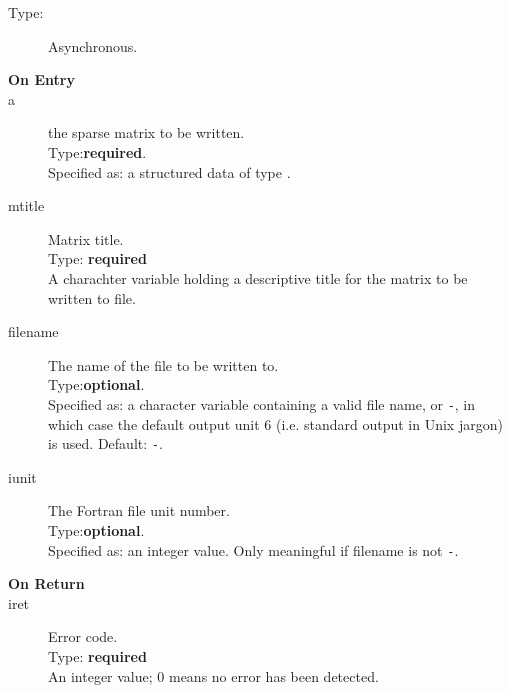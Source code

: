 \begin{description}
\item[Type:] Asynchronous.
\item[\bf  On Entry ]
\item[a] the sparse matrix to be written.\\
Type:{\bf required}.\\
Specified as: a structured data of type \spdata.
\item[mtitle] Matrix title.\\
Type: {\bf required} \\
A charachter variable holding a descriptive title for the matrix to be
 written to file.
\item[filename] The name of the file to be written to.\\
Type:{\bf optional}.\\
Specified as: a character variable containing a valid file name, or
\verb|-|, in which case the default output unit  6 (i.e. standard output
in Unix jargon) is used. Default: \verb|-|. 
\item[iunit] The Fortran file unit number.\\
Type:{\bf optional}.\\
Specified as: an integer value. Only meaningful if filename is not \verb|-|.
\end{description}

\begin{description}
\item[\bf On Return]
\item[iret] Error code.\\
Type: {\bf required} \\
An integer value; 0 means no error has been detected. 
\end{description}



